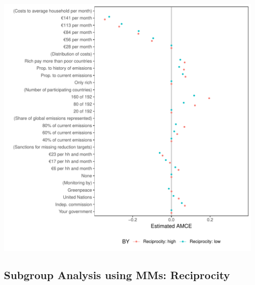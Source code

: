 \documentclass[a4paper,12pt]{article}\usepackage[]{graphicx}\usepackage[]{color}
\makeatletter
\def\maxwidth{ %
  \ifdim\Gin@nat@width>\linewidth
    \linewidth
  \else
    \Gin@nat@width
  \fi
}
\newenvironment{knitrout}{}{} %
\makeatother
\begin{document}
\begin{knitrout}
\color{fgcolor}
\includegraphics[width=\maxwidth]{figure/bechtel_subgroup_amce_reciprocity-1} 

\end{knitrout}

\clearpage

\subsection{Subgroup Analysis using MMs: Reciprocity}
\end{document}
